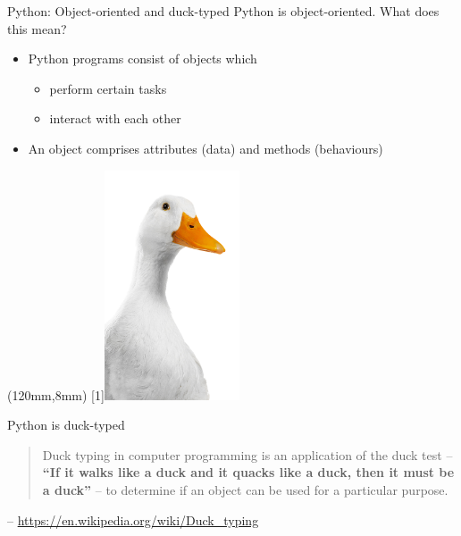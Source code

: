 \documentclass[aspectratio=169]{beamer}
\begin{document}
\begin{frame}{Python: Object-oriented and duck-typed}
    Python is \alert{object-oriented}. What does this mean?
    \begin{itemize}
        \item Python programs consist of \alert{objects} which
        \begin{itemize}
            \item perform certain tasks
            \item interact with each other
        \end{itemize}
        \item An \alert{object} comprises \alert{attributes} (data) and \alert{methods} (behaviours)
    \end{itemize}
    \begin{textblock*}{4cm}(120mm,8mm) %
        \scalebox{-1}[1]{\includegraphics[width=4cm]{Images/duck.png}}
    \end{textblock*}
    \begin{block}{Python is duck-typed}
    \begin{quote}
        Duck typing in computer programming is an application of the \alert{duck test} -- \textbf{``If it walks like a duck and it quacks like a duck, then it must be a duck''} -- to determine if an object can be used for a particular purpose.
    \end{quote}
    \footnotesize{-- \url{https://en.wikipedia.org/wiki/Duck_typing}}
    \end{block}
    \vspace{3pt}
\end{frame}
\end{document}
